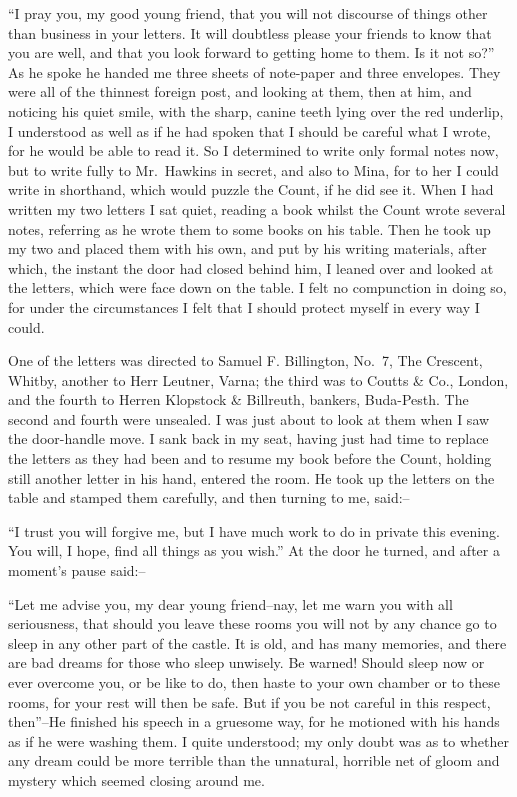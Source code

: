 \documentclass[12pt,openright]{book}
\begin{document}
“I pray you, my good young friend, that you will not discourse of things other than business in your letters. It will doubtless please your friends to know that you are well, and that you look forward to getting home to them. Is it not so?” As he spoke he handed me three sheets of note-paper and three envelopes. They were all of the thinnest foreign post, and looking at them, then at him, and noticing his quiet smile, with the sharp, canine teeth lying over the red underlip, I understood as well as if he had spoken that I should be careful what I wrote, for he would be able to read it. So I determined to write only formal notes now, but to write fully to Mr. Hawkins in secret, and also to Mina, for to her I could write in shorthand, which would puzzle the Count, if he did see it. When I had written my two letters I sat quiet, reading a book whilst the Count wrote several notes, referring as he wrote them to some books on his table. Then he took up my two and placed them with his own, and put by his writing materials, after which, the instant the door had closed behind him, I leaned over and looked at the letters, which were face down on the table. I felt no compunction in doing so, for under the circumstances I felt that I should protect myself in every way I could.

One of the letters was directed to Samuel F. Billington, No. 7, The Crescent, Whitby, another to Herr Leutner, Varna; the third was to Coutts \& Co., London, and the fourth to Herren Klopstock \& Billreuth, bankers, Buda-Pesth. The second and fourth were unsealed. I was just about to look at them when I saw the door-handle move. I sank back in my seat, having just had time to replace the letters as they had been and to resume my book before the Count, holding still another letter in his hand, entered the room. He took up the letters on the table and stamped them carefully, and then turning to me, said:–

“I trust you will forgive me, but I have much work to do in private this evening. You will, I hope, find all things as you wish.” At the door he turned, and after a moment’s pause said:–

“Let me advise you, my dear young friend–nay, let me warn you with all seriousness, that should you leave these rooms you will not by any chance go to sleep in any other part of the castle. It is old, and has many memories, and there are bad dreams for those who sleep unwisely. Be warned! Should sleep now or ever overcome you, or be like to do, then haste to your own chamber or to these rooms, for your rest will then be safe. But if you be not careful in this respect, then”–He finished his speech in a gruesome way, for he motioned with his hands as if he were washing them. I quite understood; my only doubt was as to whether any dream could be more terrible than the unnatural, horrible net of gloom and mystery which seemed closing around me.
\end{document}

